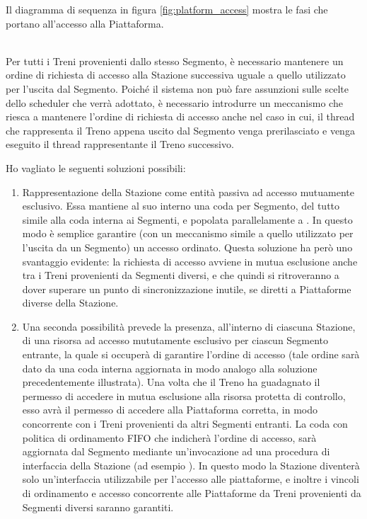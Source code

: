 		Il diagramma di sequenza in figura \ref{fig:platform_access} mostra le fasi che portano all'accesso alla Piattaforma.
		\begin{description}
			\item{}\\
		
		Per tutti i Treni provenienti dallo stesso Segmento, è necessario mantenere un ordine di richiesta di accesso alla Stazione successiva uguale a quello utilizzato per l'uscita dal Segmento. Poiché il sistema non può fare assunzioni sulle scelte dello scheduler che verrà adottato, è necessario introdurre un meccanismo che riesca a mantenere l'ordine di richiesta di accesso anche nel caso in cui, il thread che rappresenta il Treno appena uscito dal Segmento venga prerilasciato e venga eseguito il thread rappresentante il Treno successivo.

		Ho vagliato le seguenti soluzioni possibili:
		\begin{enumerate}
			\item Rappresentazione della Stazione come entità passiva ad accesso mutuamente esclusivo. Essa mantiene al suo interno una coda per Segmento, del tutto simile alla coda  interna ai Segmenti, e popolata parallelamente a . In questo modo è semplice garantire (con un meccanismo simile a quello utilizzato per l'uscita da un Segmento) un accesso ordinato. Questa soluzione ha però uno svantaggio evidente: la richiesta di accesso avviene in mutua esclusione anche tra i Treni provenienti da Segmenti diversi, e che quindi si ritroveranno a dover superare un punto di sincronizzazione inutile, se diretti a Piattaforme diverse della Stazione.
			
			\item Una seconda possibilità prevede la presenza, all'interno di ciascuna Stazione, di una risorsa ad accesso mututamente esclusivo per ciascun Segmento entrante, la quale si occuperà di garantire l'ordine di accesso (tale ordine sarà dato da una coda interna aggiornata in modo analogo alla soluzione precedentemente illustrata). Una volta che il Treno ha guadagnato il permesso di accedere in mutua esclusione alla risorsa protetta di controllo, esso avrà il permesso di accedere alla Piattaforma corretta, in modo concorrente con i Treni provenienti da altri Segmenti entranti. La coda con politica di ordinamento FIFO che indicherà l'ordine di accesso, sarà aggiornata dal Segmento mediante un'invocazione ad una procedura di interfaccia della Stazione (ad esempio ).
			In questo modo la Stazione diventerà solo un'interfaccia utilizzabile per l'accesso alle piattaforme, e inoltre i vincoli di ordinamento e accesso concorrente alle Piattaforme da Treni provenienti da Segmenti diversi saranno garantiti.
			

\end{enumerate}
\end{description}

